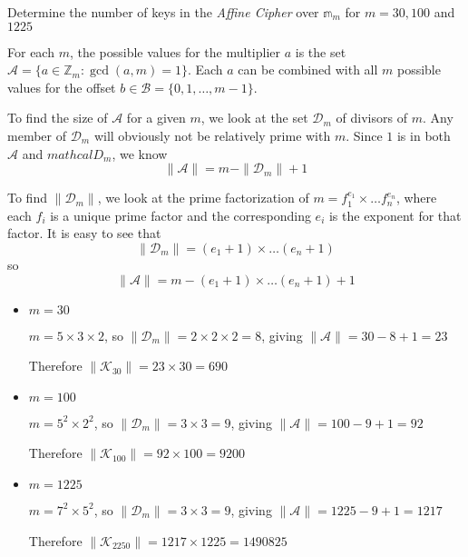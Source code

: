 \begin{statement}{1.7}
Determine the number of keys in the \textsl{Affine Cipher} over $\mathbb{m}_m$ for $m = 30, 100$ and $1225$
\end{statement}
For each $m$, the possible values for the multiplier $a$ is the set $\mathcal{A} = \{a \in \mathbb{Z}_m : \gcd (a,m) = 1\}$. Each $a$ can be combined with all $m$ possible values for the offset $b \in \mathcal{B} = \{0,1,\ldots,m-1\}$.

To find the size of $\mathcal{A}$ for a given $m$, we look at the set
$\mathcal{D}_m$ of divisors of $m$. Any member of $\mathcal{D}_m$ will
obviously not be relatively prime with $m$. Since $1$ is in both
$\mathcal{A}$ and $mathcal{D}_m$, we know
\begin{equation*}
  \| \mathcal{A} \| = m - \| \mathcal{D}_m \| + 1
\end{equation*}

To find $\| \mathcal{D}_m \|$, we look at the prime factorization of $m
= f_1^{e_1} \times \ldots f_n^{e_n}$, where each $f_i$ is a unique
prime factor and the corresponding $e_i$ is the exponent for that
factor. It is easy to see that
\begin{equation*}
  \| \mathcal{D}_m \| = (e_1 + 1) \times \ldots (e_n + 1)
\end{equation*}
so
\begin{equation*}
  \| \mathcal{A} \| = m - (e_1 + 1) \times \ldots (e_n + 1) + 1
\end{equation*}


\begin{itemize}
\item $m=30$

  $m = 5 \times 3 \times 2$, so $\| \mathcal{D}_m \| = 2 \times 2 \times 2 = 8$, giving $\| \mathcal{A} \| = 30 - 8 + 1 = 23$

  Therefore $\| \mathcal{K}_{30} \| = 23 \times 30 = 690$

\item $m=100$

  $m = 5^2 \times 2^2$, so $\| \mathcal{D}_m \| = 3 \times 3 = 9$, giving $\| \mathcal{A} \| = 100 - 9 + 1 = 92$

  Therefore $\| \mathcal{K}_{100} \| = 92 \times 100 = 9200$
  
\item $m=1225$

  $m = 7^2 \times 5^2$, so $\| \mathcal{D}_m \| = 3 \times 3 = 9$, giving $\| \mathcal{A} \| = 1225 - 9 + 1 = 1217$

    Therefore $\| \mathcal{K}_{2250} \| = 1217 \times 1225 = 1490825$
\end{itemize}
